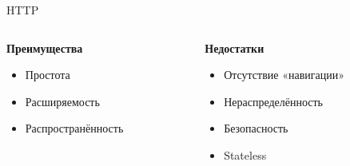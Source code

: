 \begin{frame}{HTTP}
    \begin{columns}[t] %
         \begin{column}[T]{6cm} %
            \begin{center}
                \textbf{Преимущества}
                 \begin{itemize}
                     \item Простота
                     \item Расширяемость
                     \item Распространённость
                 \end{itemize}
            \end{center}
         \end{column}
         \begin{column}[T]{7cm} %
            \begin{center}
                \textbf{Недостатки}
                 \begin{itemize}
                     \item Отсутствие «навигации»
                     \item Нераспределённость
                     \item Безопасность
                     \item Stateless
                 \end{itemize}
             \end{center}
         \end{column}
     \end{columns}
\end{frame}